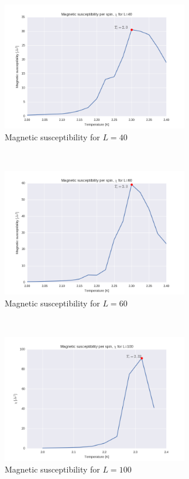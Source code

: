 \documentclass[a4paper, 10pt]{article}
\begin{document}
\begin{figure}[!ht]
    \centering
    \begin{subfigure}[H!]{0.5\textwidth}
        \centering
        \includegraphics[height=2.2in]{chil40Ne5New.png}
        \caption{Magnetic susceptibility for $L=40$}
    \end{subfigure}%
    ~ 
    \begin{subfigure}[H!]{0.5\textwidth}
        \centering
        \includegraphics[height=2.2in]{chil60Ne5New.png}
        \caption{Magnetic susceptibility for $L=60$}
    \end{subfigure}
        ~
     \begin{subfigure}[H!]{0.5\textwidth}
        \centering
        \includegraphics[height=2.2in]{chil100Ne5New.png}
        \caption{Magnetic susceptibility for $L=100$}
    \end{subfigure}%
    ~ 
    \begin{subfigure}[H!]{0.5\textwidth}

\end{subfigure}
\end{figure}
\end{document}
